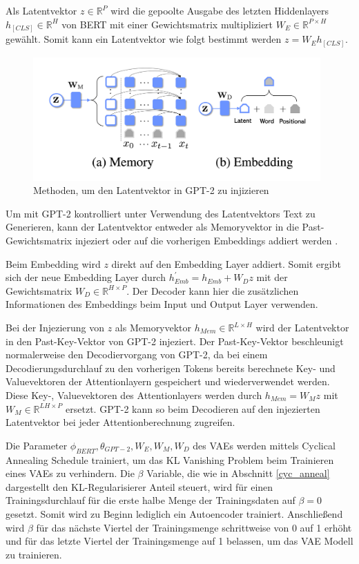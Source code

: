 Als Latentvektor $z \in \mathbb{R}^P$ wird die gepoolte Ausgabe des letzten Hiddenlayers $h_{[CLS]} \in \mathbb{R}^H$ von BERT mit einer Gewichtsmatrix multipliziert $W_{E} \in \mathbb{R}^{P\times H}$ gewählt. Somit kann ein Latentvektor wie folgt bestimmt werden $z = W_{E}h_{[CLS]}$.

\begin{figure}[h]
    \centering
    \includegraphics[width=11cm]{bilder/latent_optimus}
    \caption{Methoden, um den Latentvektor in GPT-2 zu injizieren \citep{DBLP:journals/corr/abs-2004-04092}}
    \label{latent_optimus}
\end{figure}

Um mit GPT-2 kontrolliert unter Verwendung des Latentvektors Text zu Generieren, kann der Latentvektor entweder als Memoryvektor in die Past-Gewichtsmatrix injeziert oder auf die vorherigen Embeddings addiert werden \citep{DBLP:journals/corr/abs-2004-04092}.

Beim Embedding wird $z$ direkt auf den Embedding Layer addiert. Somit ergibt sich der neue Embedding Layer durch $h_{Emb}^{'} = h_{Emb} + W_D z$ mit der Gewichtsmatrix $W_D \in \mathbb{R}^{H \times P}$.
Der Decoder kann hier die zusätzlichen Informationen des Embeddings beim Input und Output Layer verwenden.

Bei der Injezierung von $z$ als Memoryvektor $h_{Mem} \in \mathbb{R}^{L\times H}$ wird der Latentvektor in den Past-Key-Vektor von GPT-2 injeziert. 
Der Past-Key-Vektor beschleunigt normalerweise den Decodiervorgang von GPT-2, da bei einem Decodierungsdurchlauf zu den vorherigen Tokens bereits berechnete Key- und Valuevektoren der Attentionlayern gespeichert und wiederverwendet werden.
Diese Key-, Valuevektoren des Attentionlayers werden durch $h_{Mem} = W_M z$ mit $W_M \in \mathbb{R}^{LH \times P}$ ersetzt. GPT-2 kann so beim Decodieren auf den injezierten Latentvektor bei jeder Attentionberechnung zugreifen.

Die Parameter ${\phi_{BERT}, \theta_{GPT-2}, W_E,W_M,W_D}$ des VAEs werden mittels Cyclical Annealing Schedule \citep{cyc_anneal} trainiert, um das KL Vanishing Problem beim Trainieren eines VAEs zu verhindern.
Die $\beta$ Variable, die wie in Abschnitt \ref{cyc_anneal} dargestellt den KL-Regularisierer Anteil steuert, wird für einen Trainingsdurchlauf für die erste halbe Menge der Trainingsdaten auf $\beta = 0$ gesetzt. Somit wird zu Beginn lediglich ein Autoencoder trainiert. 
Anschließend wird $\beta$ für das nächste Viertel der Trainingsmenge schrittweise von 0 auf 1 erhöht und für das letzte Viertel der Trainingsmenge auf 1 belassen, um das VAE Modell zu trainieren.

